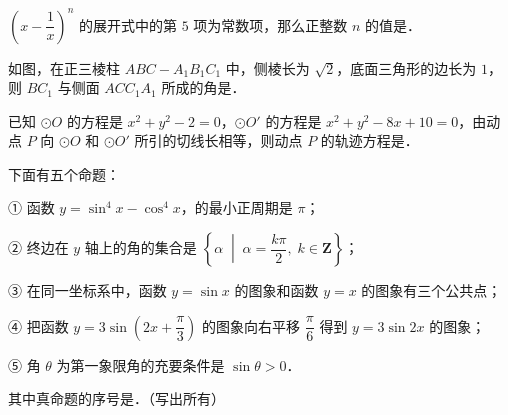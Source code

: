 \begin{question}
$\left(x-\dfrac1x\right)^n$ 的展开式中的第 $5$ 项为常数项，那么正整数 $n$ 的值是\gkblank{}．

\Needspace{0.4\textheight}
\end{question}
\begin{question}
如图，在正三棱柱 $ABC-A_1B_1C_1$ 中，侧棱长为 $\sqrt2$，底面三角形的边长为 $1$，则 $BC_1$ 与侧面 $ACC_1A_1$ 所成的角是\gkblank{}．
\nopagebreak[4]
\begin{center}\end{center}
\nopagebreak[4]
\end{question}
\begin{question}
已知 $\odot O$ 的方程是 $x^2+y^2-2=0$，$\odot O'$ 的方程是 $x^2+y^2-8x+10=0$，由动点 $P$ 向 $\odot O$ 和 $\odot O'$ 所引的切线长相等，则动点 $P$ 的轨迹方程是\gkblank{}．

\end{question}
\begin{question}
下面有五个命题：

① 函数 $y=\sin^4x-\cos^4x$，的最小正周期是 $\pi$；

② 终边在 $y$ 轴上的角的集合是 $\left\{\alpha\;\middle|\;\alpha=\dfrac{k\pi}{2},\;k\in\mathbf Z\right\}$；

③ 在同一坐标系中，函数 $y=\sin x$ 的图象和函数 $y=x$ 的图象有三个公共点；

④ 把函数 $y=3\sin\left(2x+\dfrac{\pi}{3}\right)$ 的图象向右平移 $\dfrac{\pi}{6}$ 得到 $y=3\sin2x$ 的图象；

⑤ 角 $\theta$ 为第一象限角的充要条件是 $\sin\theta>0$．

其中真命题的序号是\gkblank{}．（写出所有）

\end{question}

